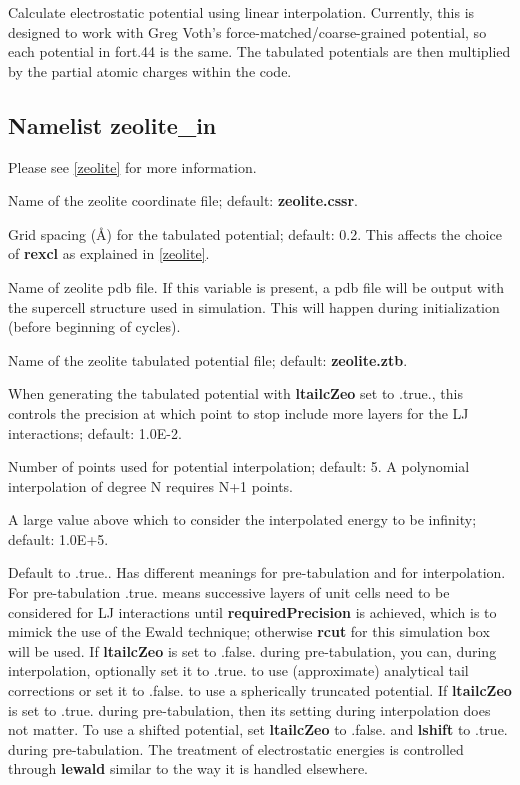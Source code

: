 \documentclass[12pt,letterpaper]{article}
\begin{document}
 Calculate electrostatic
potential using linear interpolation. Currently, this is
designed to work with Greg Voth's
force-matched/coarse-grained potential, so each potential in
fort.44 is the same. The tabulated potentials are then
multiplied by the partial atomic charges within the code.

\subsection{Namelist \textbf{zeolite\_in}}
\label{zeolite_in}
Please see \ref{zeolite} for more information.

 Name of the zeolite
coordinate file; default: \textbf{zeolite.cssr}.

 Grid spacing (\AA) for the tabulated
potential; default: 0.2. This affects the choice of
\textbf{rexcl} as explained in \ref{zeolite}.

 Name of zeolite pdb file.
If this variable is present, a pdb file will be output
with the supercell structure used in simulation.
This will happen during initialization (before beginning of
cycles).

 Name of the zeolite tabulated
potential file; default: \textbf{zeolite.ztb}.

 When generating the
tabulated potential with \textbf{ltailcZeo} set to .true.,
this controls the precision at which point to stop include
more layers for the LJ interactions; default: 1.0E-2.

 Number of points
used for potential interpolation; default: 5. A polynomial
interpolation of degree N requires N+1 points.

 A large value above which to
consider the interpolated energy to be infinity; default:
1.0E+5.

 Default to .true.. Has different
meanings for pre-tabulation and for interpolation. For
pre-tabulation .true. means successive layers of unit cells
need to be considered for LJ interactions until
\textbf{requiredPrecision} is achieved, which is to mimick
the use of the Ewald technique; otherwise \textbf{rcut} for
this simulation box will be used. If \textbf{ltailcZeo} is
set to .false. during pre-tabulation, you can, during
interpolation, optionally set it to .true. to use
(approximate) analytical tail corrections or set it to
.false. to use a spherically truncated potential. If
\textbf{ltailcZeo} is set to .true. during pre-tabulation,
then its setting during interpolation does not matter. To
use a shifted potential, set \textbf{ltailcZeo} to .false.
and \textbf{lshift} to .true. during pre-tabulation. The
treatment of electrostatic energies is controlled through
\textbf{lewald} similar to the way it is handled elsewhere.
\end{document}
